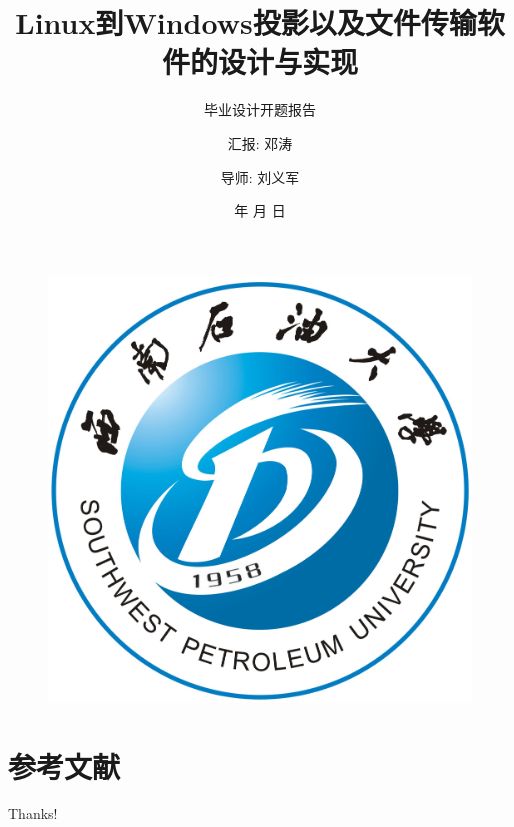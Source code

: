\documentclass[aspectratio=169]{beamer}
\author{汇报: 邓涛 \and 导师: 刘义军}
\title{Linux到Windows投影以及文件传输软件的设计与实现}
\subtitle{毕业设计开题报告}
\institute{计算机科学学院}
\date{\the\year 年 \the\month 月 \the\day 日}
\begin{document}
\heiti
\begin{frame}
    \titlepage
    \begin{figure}[H]
        \begin{center}
            \includegraphics[width=0.15\linewidth]{pic/logo_blue_guodu.jpg}
        \end{center}
    \end{figure}
\end{frame}

\begin{frame}
    \tableofcontents[sectionstyle=show,subsectionstyle=show/shaded/hide,subsubsectionstyle=show/shaded/hide]
\end{frame}







\section{参考文献}

\begin{frame}[allowframebreaks]
    \tiny
    
\end{frame}

\begin{frame}
    \begin{center}
        {\Huge\calligra Thanks!}
    \end{center}
\end{frame}
\end{document}
